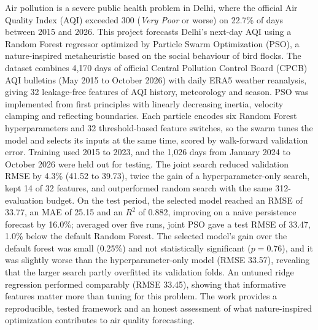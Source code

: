 Air pollution is a severe public health problem in Delhi, where the official Air Quality Index (AQI) exceeded 300 (\emph{Very Poor} or worse) on 22.7\% of days between 2015 and 2026. This project forecasts Delhi's next-day AQI using a Random Forest regressor optimized by Particle Swarm Optimization (PSO), a nature-inspired metaheuristic based on the social behaviour of bird flocks. The dataset combines 4,170 days of official Central Pollution Control Board (CPCB) AQI bulletins (May 2015 to October 2026) with daily ERA5 weather reanalysis, giving 32 leakage-free features of AQI history, meteorology and season. PSO was implemented from first principles with linearly decreasing inertia, velocity clamping and reflecting boundaries. Each particle encodes six Random Forest hyperparameters and 32 threshold-based feature switches, so the swarm tunes the model and selects its inputs at the same time, scored by walk-forward validation error. Training used 2015 to 2023, and the 1,026 days from January 2024 to October 2026 were held out for testing. The joint search reduced validation RMSE by 4.3\% (41.52 to 39.73), twice the gain of a hyperparameter-only search, kept 14 of 32 features, and outperformed random search with the same 312-evaluation budget. On the test period, the selected model reached an RMSE of 33.77, an MAE of 25.15 and an $R^2$ of 0.882, improving on a naive persistence forecast by 16.0\%; averaged over five runs, joint PSO gave a test RMSE of 33.47, 1.0\% below the default Random Forest. The selected model's gain over the default forest was small (0.25\%) and not statistically significant ($p = 0.76$), and it was slightly worse than the hyperparameter-only model (RMSE 33.57), revealing that the larger search partly overfitted its validation folds. An untuned ridge regression performed comparably (RMSE 33.45), showing that informative features matter more than tuning for this problem. The work provides a reproducible, tested framework and an honest assessment of what nature-inspired optimization contributes to air quality forecasting.
